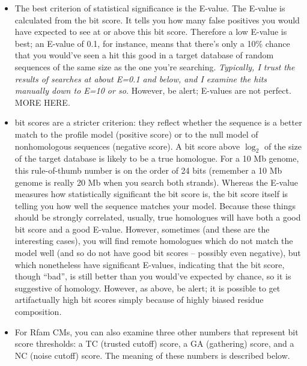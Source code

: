 \begin{itemize}
\item The best criterion of statistical significance is the E-value.
The E-value is calculated from the bit score. It tells you how many
false positives you would have expected to see at or above this bit
score. Therefore a low E-value is best; an E-value of 0.1, for
instance, means that there's only a 10\% chance that you would've seen
a hit this good in a target database of random sequences of the same
size as the one you're searching. {\em
Typically, I trust the results of searches at about E=0.1 and below,
and I examine the hits manually down to E=10 or so.}  However, be
alert;  E-values are not perfect. MORE HERE.

\item {} bit scores are a stricter criterion: they
  reflect whether the sequence is a better match to the profile model
  (positive score) or to the null model of nonhomologous sequences
  (negative score).  A bit score above $\log_2$ of the size of the
  target database is likely to be a true
  homologue. For a 10 Mb genome, this rule-of-thumb number is on
  the order of 24 bits (remember a 10 Mb genome is really 20 Mb when
  you search both strands).  Whereas the E-value measures how
  statistically significant the bit score is, the bit score itself is
  telling you how well the sequence matches your model. Because these
  things should be strongly correlated, usually, true homologues will
  have both a good bit score and a good E-value. However, sometimes
  (and these are the interesting cases), you will find remote
  homologues which do not match the model well (and so do not have
  good bit scores -- possibly even negative), but which nonetheless
  have significant E-values, indicating that the bit score, though
  ``bad'', is still better than you would've expected by chance, so it
  is suggestive of homology. However, as above, be alert; it is
  possible to get artifactually high bit scores simply because of
  highly biased residue composition.

\item For Rfam CMs, you can also examine three other numbers that
represent bit score thresholds: a TC (trusted cutoff) score, a GA
(gathering) score, and a NC (noise cutoff) score. The meaning of
these numbers is described below.
\end{itemize}

